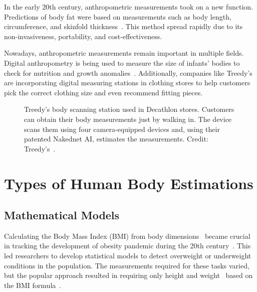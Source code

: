 In the early 20th century, anthropometric measurements took on a new function. Predictions of body fat were based on measurements such as body length, circumference, and skinfold thickness~\cite{anthroHist2}. This method spread rapidly due to its non-invasiveness, portability, and cost-effectiveness.

Nowadays, anthropometric measurements remain important in multiple fields. Digital anthropometry is being used to measure the size of infants' bodies to check for nutrition and growth anomalies~\cite{nutrition}. Additionally, companies like Treedy's~\cite{treedys} are incorporating digital measuring stations in clothing stores to help customers pick the correct clothing size and even recommend fitting pieces.

\begin{figure}
	\caption[Treedy's scanning device]{Treedy's body scanning station used in Decathlon stores. Customers can obtain their body measurements just by walking in. The device scans them using four camera-equipped devices and, using their patented Nakednet AI, estimates the measurements. Credit: Treedy's~\cite{treedys}.}
	\label{treedys}
\end{figure}

\section{Types of Human Body Estimations}
\subsection{Mathematical Models}
Calculating the Body Mass Index (BMI) from body dimensions~\cite{bmiPredict} became crucial in tracking the development of obesity pandemic during the 20th century~\cite{bmiUsage}. This led researchers to develop statistical models to detect overweight or underweight conditions in the population. The measurements required for these tasks varied, but the popular approach resulted in requiring only height and weight~\cite{bmiHW} based on the BMI formula~\cite{bmi}.

